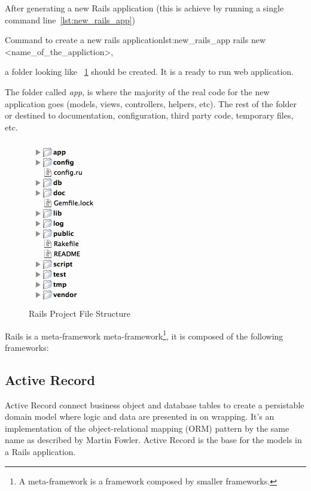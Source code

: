 After generating a new Rails application (this is achieve by running a single command line~\ref{lst:new_rails_app}) 

\begin{rubycode}{Command to create a new rails application}{lst:new_rails_app}
  rails new <name\_of\_the\_appliction>,

\end{rubycode}
a folder looking like ~\ref{fig:rails_file_structure} should be created. 
It is a ready to run web application.

The folder called \emph{app}, 
is where the majority of the real code for the new application goes (models, views, controllers, helpers, etc).
The rest of the folder or destined to documentation, configuration, third party code, temporary files, etc.

\begin{figure}[h!]
  \caption{Rails Project File Structure}\label{fig:rails_file_structure}
  \centering
  \includegraphics[scale=0.75]{Images/rails_files}
\end{figure}

Rails is a meta-framework 
\textsf{meta-framework}\footnote{
  A meta-framework is a framework composed by smaller frameworks.
}, it is composed of the following frameworks:


\subsection{Active Record}
Active Record connect business object and database tables to create a persistable domain model where logic and data are presented in on wrapping. It’s an implementation of the object-relational mapping (ORM) pattern by the same name as described by Martin Fowler.
Active Record is the base for the models in a Rails application.

